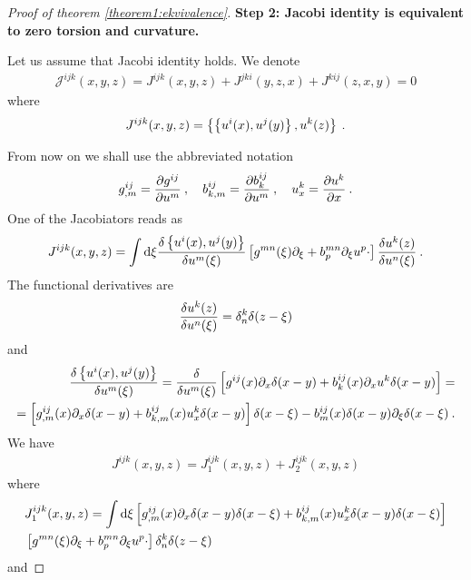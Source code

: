 \begin{proof}[Proof of theorem \ref{theorem1:ekvivalence}]
    \textbf{Step 2: Jacobi identity is equivalent to zero torsion and curvature.} 
    
    Let us assume that Jacobi identity holds. We denote
    \begin{align}
        \mathcal J^{ijk}(x,y,z) = J^{ijk}(x,y,z)+ J^{jki}(y,z,x)+ J^{kij}(z,x,y) = 0
    \end{align}
    where
    \begin{align}
        J^{ijk}(x,y,z) = \left \lbrace \left \lbrace u^i(x),u^j(y) \right \rbrace, u^k(z) \right \rbrace \:.
    \end{align}

    From now on we shall use the abbreviated notation
    \begin{align}
        g^{ij}_{,m} = \frac{\partial g^{ij}}{\partial u^m} \:, \quad b^{ij}_{k,m} = \frac{\partial b^{ij}_k}{\partial u^m} \:, \quad u^k_x = \frac{\partial u^k}{\partial x}  \:.
    \end{align}
    One of the Jacobiators reads as
    \begin{align*}
        J^{ijk}(x,y,z) =
        \int \mathrm{d} \xi \frac{\delta \left \lbrace u^i(x),u^j(y) \right \rbrace}{\delta u^m(\xi)} 
        \left[ g^{mn}(\xi) \partial_\xi + b^{mn}_p \partial_\xi u^p \cdot \right] \frac{\delta u^k(z)}{\delta u^n(\xi)}  \:.
    \end{align*}
    The functional derivatives are
    \begin{align}
        \frac{\delta u^k(z)}{\delta u^n(\xi)} = \delta^k_n \delta(z-\xi)
    \end{align}
    and 
    \begin{align}
        \frac{\delta \left \lbrace u^i(x),u^j(y) \right \rbrace}{\delta u^m(\xi)} = \frac{\delta }{\delta u^m(\xi)} \left[ g^{ij}(x) \partial_x \delta(x-y) + b^{ij}_k(x) \partial_x u^k \delta(x-y)\right] = 
        \nonumber
        \\ = \left[ g^{ij}_{,m}(x) \partial_x \delta(x-y) + b^{ij}_{k,m}(x) u^k_x \delta(x-y) \right] \delta (x-\xi) - b^{ij}_m(x) \delta(x-y) \partial_\xi \delta(x-\xi) \:.
    \end{align}
    We have
    \begin{align}
        J^{ijk}(x,y,z) = J_1^{ijk}(x,y,z) + J_2^{ijk}(x,y,z) 
    \end{align}
    where
    \begin{align*}
        & J_1^{ijk}(x,y,z) = \int \mathrm{d} \xi  \left[ g^{ij}_{,m}(x) \partial_x \delta(x-y) \delta(x-\xi) + b^{ij}_{k,m}(x) u^k_x \delta(x-y) \delta(x-\xi) \right]   \\ 
        & \left[ g^{mn}(\xi) \partial_\xi + b^{mn}_p \partial_\xi u^p \cdot \right] \delta^k_n \delta(z-\xi)  
    \end{align*}
    and 

\end{proof}
